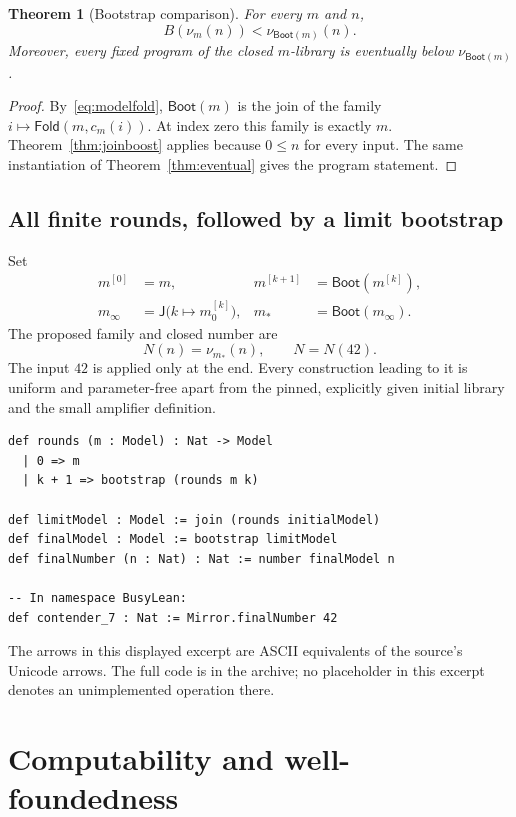 \documentclass[11pt,letterpaper]{article}
\newtheorem{theorem}{Theorem}[section]
\theoremstyle{definition}
\renewcommand{\Join}{\mathsf J}
\newcommand{\Fold}{\mathsf{Fold}}
\newcommand{\Boot}{\mathsf{Boot}}
\begin{document}
\begin{theorem}[Bootstrap comparison]
\label{thm:bootstrap}
For every $m$ and $n$,
\[
 B(\nu_m(n))<\nu_{\Boot(m)}(n).
\]
Moreover, every fixed program of the closed $m$-library is eventually below
$\nu_{\Boot(m)}$.
\end{theorem}
\begin{proof}
By~\eqref{eq:modelfold}, $\Boot(m)$ is the join of the family
$i\mapsto\Fold(m,c_m(i))$. At index zero this family is exactly $m$.
Theorem~\ref{thm:joinboost} applies because $0\le n$ for every input. The same
instantiation of Theorem~\ref{thm:eventual} gives the program statement.
\end{proof}

\subsection{All finite rounds, followed by a limit bootstrap}

Set
\begin{align}
 m^{[0]}&=m,& m^{[k+1]}&=\Boot(m^{[k]}),\\
 m_\infty&=\Join\bigl(k\mapsto m_0^{[k]}\bigr),&
 m_*&=\Boot(m_\infty).
\end{align}
The proposed family and closed number are
\begin{equation}
 N(n)=\nu_{m_*}(n),\qquad N=N(42).
\label{eq:final}
\end{equation}
The input $42$ is applied only at the end. Every construction leading to it is
uniform and parameter-free apart from the pinned, explicitly given initial
library and the small amplifier definition.

\begin{lstlisting}
def rounds (m : Model) : Nat -> Model
  | 0 => m
  | k + 1 => bootstrap (rounds m k)

def limitModel : Model := join (rounds initialModel)
def finalModel : Model := bootstrap limitModel
def finalNumber (n : Nat) : Nat := number finalModel n

-- In namespace BusyLean:
def contender_7 : Nat := Mirror.finalNumber 42
\end{lstlisting}

The arrows in this displayed excerpt are ASCII equivalents of the source's
Unicode arrows. The full code is in the archive; no placeholder in this
excerpt denotes an unimplemented operation there.

\section{Computability and well-foundedness}
\label{sec:computability}
\end{document}
